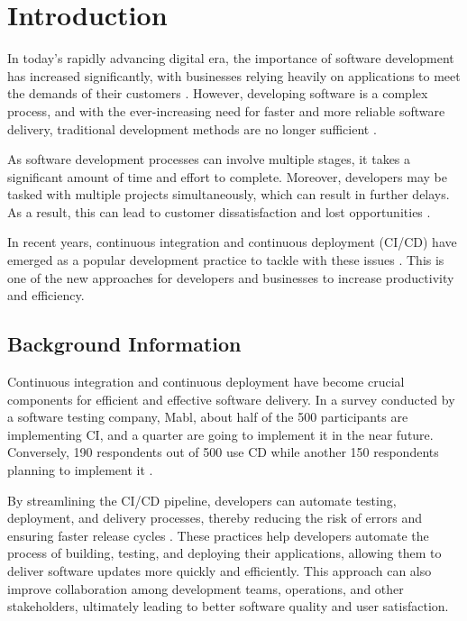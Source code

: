 \chapter{Introduction}

In today's rapidly advancing digital era, the importance of software development has increased significantly, with businesses relying heavily on applications to meet the demands of their customers \cite{hf}. However, developing software is a complex process, and with the ever-increasing need for faster and more reliable software delivery, traditional development methods are no longer sufficient \cite{dsmgm}. 

As software development processes can involve multiple stages, it takes a significant amount of time and effort to complete. Moreover, developers may be tasked with multiple projects simultaneously, which can result in further delays. As a result, this can lead to customer dissatisfaction and lost opportunities \cite{sb}.

In recent years, continuous integration and continuous deployment (CI/CD) have emerged as a popular development practice to tackle with these issues \cite{sander}. This is one of the new approaches for developers and businesses to increase productivity and efficiency.

\section{Background Information}

Continuous integration and continuous deployment have become crucial components for efficient and effective software delivery. In a survey conducted by a software testing company, Mabl, about half of the 500 participants are implementing CI, and a quarter are going to implement it in the near future. Conversely, 190 respondents out of 500 use CD while another 150 respondents planning to implement it \cite{clark}. 

By streamlining the CI/CD pipeline, developers can automate testing, deployment, and delivery processes, thereby reducing the risk of errors and ensuring faster release cycles \cite{kubinyi}. These practices help developers automate the process of building, testing, and deploying their applications, allowing them to deliver software updates more quickly and efficiently. This approach can also improve collaboration among development teams, operations, and other stakeholders, ultimately leading to better software quality and user satisfaction\cite{bs}.

